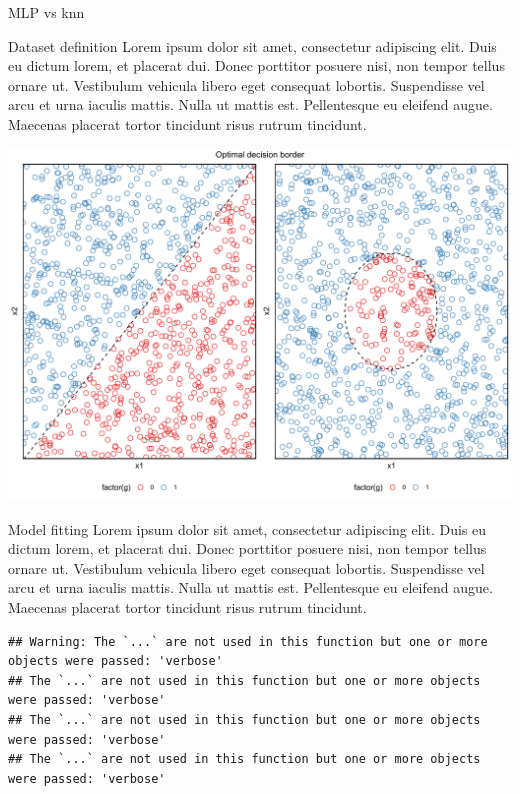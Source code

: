 \documentclass[
  ignorenonframetext,
]{article}
\begin{document}
\begin{frame}[fragile]{MLP vs knn}
\protect\hypertarget{mlp-vs-knn}{}
\begin{block}{Dataset definition}
\protect\hypertarget{dataset-definition-6}{}
Lorem ipsum dolor sit amet, consectetur adipiscing elit. Duis eu dictum lorem, et placerat dui. Donec porttitor posuere nisi, non tempor tellus ornare ut. Vestibulum vehicula libero eget consequat lobortis. Suspendisse vel arcu et urna iaculis mattis. Nulla ut mattis est. Pellentesque eu eleifend augue. Maecenas placerat tortor tincidunt risus rutrum tincidunt.

\begin{center}\includegraphics{_main_files/figure-beamer/unnamed-chunk-89-1} \end{center}
\end{block}

\begin{block}{Model fitting}
\protect\hypertarget{model-fitting-6}{}
Lorem ipsum dolor sit amet, consectetur adipiscing elit. Duis eu dictum lorem, et placerat dui. Donec porttitor posuere nisi, non tempor tellus ornare ut. Vestibulum vehicula libero eget consequat lobortis. Suspendisse vel arcu et urna iaculis mattis. Nulla ut mattis est. Pellentesque eu eleifend augue. Maecenas placerat tortor tincidunt risus rutrum tincidunt.

\begin{verbatim}
## Warning: The `...` are not used in this function but one or more objects were passed: 'verbose'
## The `...` are not used in this function but one or more objects were passed: 'verbose'
## The `...` are not used in this function but one or more objects were passed: 'verbose'
## The `...` are not used in this function but one or more objects were passed: 'verbose'
\end{verbatim}
\end{block}


\end{frame}
\end{document}
